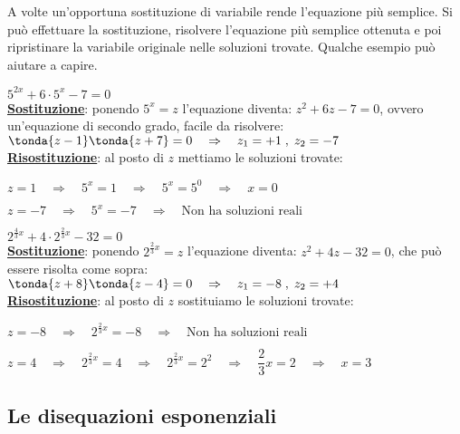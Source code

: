 A volte un'opportuna sostituzione di variabile rende l'equazione più 
semplice. 
Si può effettuare la sostituzione, risolvere l'equazione più semplice 
ottenuta e 
poi ripristinare la variabile originale nelle soluzioni trovate. Qualche 
esempio può aiutare a capire.

\begin{esempio} 
\(5^{2x} +6 \cdot 5^x -7=0\) \\[4pt]
\textbf{\underline{Sostituzione}}:
ponendo \(5^x=z\) l'equazione diventa: \(z^2 +6z -7=0\), ovvero 
un'equazione di secondo grado, facile da risolvere:
\(\tonda{z-1} \tonda{z+7}=0 \quad \Rightarrow \quad z_1=+1 \;,\; z_2=-7\) 
 \\[4pt]
\textbf{\underline{Risostituzione}}: al posto di \(z\) mettiamo le 
soluzioni trovate:

\(z = 1\quad \Rightarrow \quad 5^x=1 \quad \Rightarrow \quad 5^x=5^0\quad 
\Rightarrow \quad x=0\)

\(z = -7 \quad \Rightarrow \quad 5^x=-7 \quad \Rightarrow \quad \text{Non 
ha soluzioni reali}\)
\end{esempio}

\begin{esempio} 
\(2^{\frac{4}{3}x} +4 \cdot 2^{\frac{2}{3}x} -32=0\) \\[4pt]
\textbf{\underline{Sostituzione}}:
ponendo \(2^{\frac{2}{3}x}=z\) l'equazione diventa: \(z^2 +4z -32=0\), che 
può essere
risolta come sopra:
\(\tonda{z+8}\tonda{z-4}=0 \quad \Rightarrow \quad z_1=-8 \;,\; z_2=+4\) 
\\[4pt]
\textbf{\underline{Risostituzione}}: al posto di \(z\) sostituiamo le 
soluzioni trovate:

\(z = -8\quad \Rightarrow \quad 2^{\frac{2}{3}x}=-8 \quad \Rightarrow \quad 
\text{Non ha soluzioni reali}\)

\(z = 4\quad \Rightarrow \quad 2^{\frac{2}{3}x}=4 \quad \Rightarrow \quad 
2^{\frac{2}{3}x}=2^2
\quad \Rightarrow \quad\dfrac{2}{3}x=2 \quad \Rightarrow \quad x=3\)
\end{esempio}

\subsection{Le disequazioni esponenziali}
\label{subsubsec:esplog_disequazioniesponenziali}


